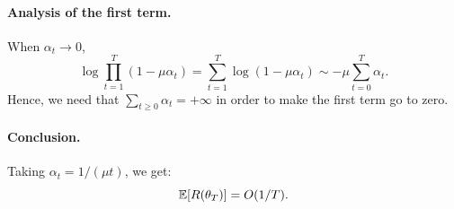 \documentclass[11pt,nocut]{article}
\begin{document}
\paragraph{Analysis of the first term.}
When $\alpha_t \to 0$, 
$$\log \prod_{t=1}^T (1-\mu \alpha_t) =\sum_{t=1}^T \log (1-\mu \alpha_t) \sim - \mu \sum_{t=0}^{T} \alpha_t.$$
Hence, we need that $\sum_{t \geq 0} \alpha_t = +\infty$ in order to make the first term go to zero.
\\

\paragraph{Conclusion.}
Taking $\alpha_t = 1/(\mu t)$, we get:
$$
\mathbb{E}[R(\theta_T)] = O(1/T).
$$
\end{document}
